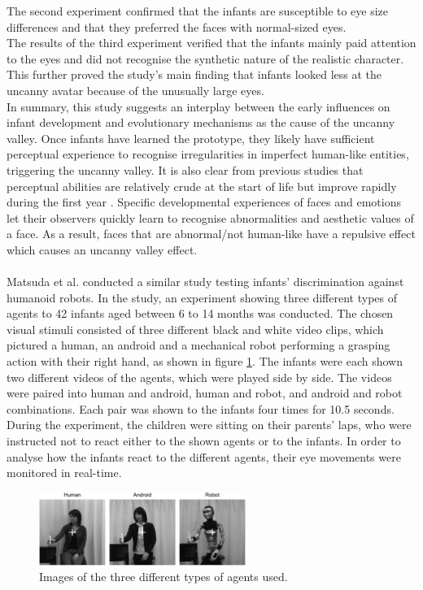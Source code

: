 The second experiment confirmed that the infants are susceptible to eye size differences and that they preferred the faces with normal-sized eyes.\\
The results of the third experiment verified that the infants mainly paid attention to the eyes and did not recognise the synthetic nature of the realistic character. This further proved the study's main finding that infants looked less at the uncanny avatar because of the unusually large eyes.\\
In summary, this study suggests an interplay between the early influences on infant development and evolutionary mechanisms as the cause of the uncanny valley. Once infants have learned the prototype, they likely have sufficient perceptual experience to recognise irregularities in imperfect human-like entities, triggering the uncanny valley. It is also clear from previous studies that perceptual abilities are relatively crude at the start of life but improve rapidly during the first year \cite{Lewkowicz2009_perceptual_abilities,Pascalis2009_perceptual_abilities}. Specific developmental experiences of faces and emotions let their observers quickly learn to recognise abnormalities and aesthetic values of a face. As a result, faces that are abnormal/not human-like have a repulsive effect which causes an uncanny valley effect.\\\\
Matsuda et al. \cite{uncanny_infant_discrimination} conducted a similar study testing infants' discrimination against humanoid robots. In the study, an experiment showing three different types of agents to 42 infants aged between 6 to 14 months was conducted. The chosen visual stimuli consisted of three different black and white video clips, which pictured a human, an android and a mechanical robot performing a grasping action with their right hand, as shown in figure \ref{fig:uncannyInfantsDiscrimination}. The infants were each shown two different videos of the agents, which were played side by side. 
\newpage
The videos were paired into human and android, human and robot, and android and robot combinations. Each pair was shown to the infants four times for 10.5 seconds. During the experiment, the children were sitting on their parents' laps, who were instructed not to react either to the shown agents or to the infants. In order to analyse how the infants react to the different agents, their eye movements were monitored in real-time.
\begin{figure} %
    \centering
    \includegraphics[width=0.6\textwidth]{graphics/uncanny_infants_discrimination.png}
    \caption{Images of the three different types of agents used.}
    \label{fig:uncannyInfantsDiscrimination}
\end{figure}
